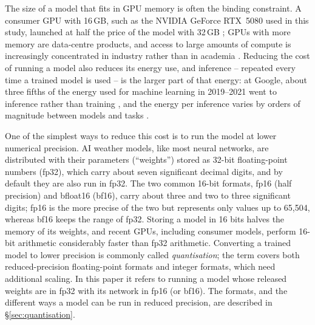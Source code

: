  The
size of a model that fits in GPU memory is often the binding constraint.
A consumer GPU with 16\,GB, such as the NVIDIA GeForce
RTX~5080 used in this study, launched at half the price of the model
with 32\,GB \citep{nvidia2025rtx50}; GPUs with more memory are
data-centre products, and access to large amounts of compute is
increasingly concentrated in industry rather than in academia
\citep{besiroglu2024compute}. Reducing the cost of running a model
also reduces its energy use, and inference -- repeated every time a
trained model is used -- is the larger part of that energy: at Google,
about three fifths of the energy used for machine learning in
2019--2021 went to inference rather than training
\citep{patterson2022carbon}, and the energy per inference varies by
orders of magnitude between models and tasks \citep{luccioni2024power}.

One of the simplest ways to reduce this cost is to run the model at
lower numerical precision. AI weather models, like most neural networks,
are distributed with their parameters (``weights'') stored as 32-bit
floating-point numbers (fp32), which carry about seven significant
decimal digits, and by default they are also run in fp32. The two common
16-bit formats, fp16 (half precision) and bfloat16 (bf16), carry about
three and two to three significant digits; fp16 is the more precise of
the two but represents only values up to 65{,}504, whereas bf16 keeps the
range of fp32. Storing a model in 16 bits halves the memory of its
weights, and recent GPUs, including consumer models, perform 16-bit
arithmetic considerably faster than fp32 arithmetic. Converting a trained
model to lower precision is commonly called \emph{quantisation}; the
term covers both reduced-precision floating-point formats and integer
formats, which need additional scaling. In this paper it refers to
running a model whose released weights are in fp32 with its network in
fp16 (or bf16). The formats, and the different ways a model can be run in
reduced precision, are described in \S\ref{sec:quantisation}.

